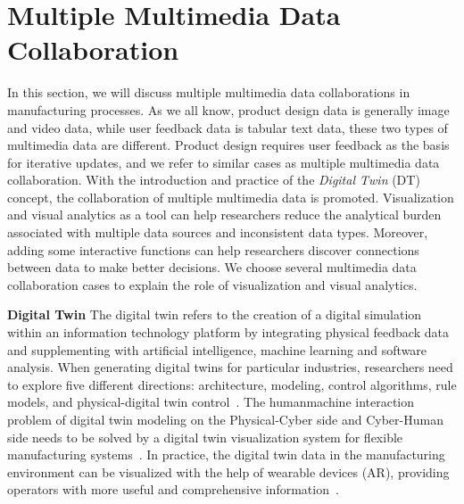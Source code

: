 \documentclass[a4paper,fleqn]{cas-dc}
\begin{document}
\section{Multiple Multimedia Data Collaboration}
In this section, we will discuss multiple multimedia data collaborations in manufacturing processes.
As we all know, product design data is generally image and video data, while user feedback data is tabular text data, these two types of multimedia data are different. Product design requires user feedback as the basis for iterative updates, and we refer to similar cases as multiple multimedia data collaboration.
With the introduction and practice of the \textit{Digital Twin} (DT) concept, the collaboration of multiple multimedia data is promoted.
Visualization and visual analytics as a tool can help researchers reduce the analytical burden associated with multiple data sources and inconsistent data types.
Moreover, adding some interactive functions can help researchers discover connections between data to make better decisions.
We choose several multimedia data collaboration cases to explain the role of visualization and visual analytics.

\textbf{Digital Twin}
The digital twin refers to the creation of a digital simulation within an information technology platform by integrating physical feedback data and supplementing with artificial intelligence, machine learning and software analysis. When generating digital twins for particular industries, researchers need to explore five different directions: architecture, modeling, control algorithms, rule models, and physical-digital twin control~\cite{lei2021toward}. The humanmachine interaction problem of digital twin modeling on the Physical-Cyber side and Cyber-Human side needs to be solved by a digital twin visualization system for flexible manufacturing systems~\cite{Fan2021}. In practice, the digital twin data in the manufacturing environment can be visualized with the help of wearable devices (AR), providing operators with more useful and comprehensive information~\cite{Zhu2019}.
\end{document}
